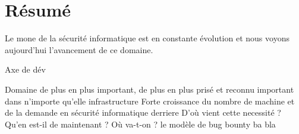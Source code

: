 \chapter*{Résumé}

 Le mone de la sécurité informatique est en constante évolution et nous voyons aujourd'hui l'avancement de ce domaine.

Axe de dév

Domaine de plus en plus important, de plus en plus prisé et reconnu
important dans n'importe qu'elle infrastructure 
Forte croissance du nombre de machine et de la demande en sécurité informatique derriere 
D'où vient cette necessité ? Qu'en est-il de maintenant ? Où va-t-on ? le modèle de bug bounty ba bla


